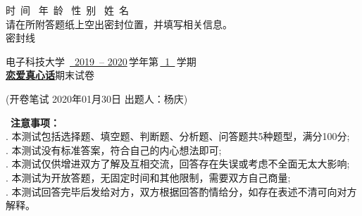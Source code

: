 \documentclass[twocolumn,landscape,UTF8]{ctexart}
\begin{document}
\fancyhf{}
\sbox{\zdx}
{\parbox{27cm}{\centering
	时~间\underline{\makebox[34mm][c]{}}~
	年~龄\underline{\makebox[34mm][c]{}}~ 性~别\underline{\makebox[44mm][c]{}}~
	姓~名\underline{\makebox[34mm][c]{}}~\\
	\vspace{3mm}
请在所附答题纸上空出密封位置，并填写相关信息。\\
\vspace{1mm}
\dotfill{} 密\dotfill{}封\dotfill{}线\dotfill{} \\
	}}
	\reversemarginpar
	
\begin{spacing}{1.25}
\begin{center}
\begin{LARGE}
	
电子科技大学~\underline{~2019~-- 2020}\,学年第\,\underline{~1~}\,学期\\
\underline{\textbf{恋爱真心话}}期末试卷\\

\end{LARGE}
(开卷笔试 \quad  \quad 2020年01月30日 \quad 出题人：杨庆)\\


\begin{flushleft}
\ \textbf{注意事项：}\\
. 本测试包括选择题、填空题、判断题、分析题、问答题共5种题型，满分100分;\\
. 本测试没有标准答案，符合自己的内心想法即可;\\
. 本测试仅供增进双方了解及互相交流，回答存在失误或考虑不全面无太大影响;\\
. 本测试为开放答题，无固定时间和其他限制，需要双方自己商量;\\
. 本测试回答完毕后发给对方，双方根据回答酌情给分，如存在表述不清可向对方解释。

\end{flushleft}



\end{center}
\end{spacing}
\end{document}
